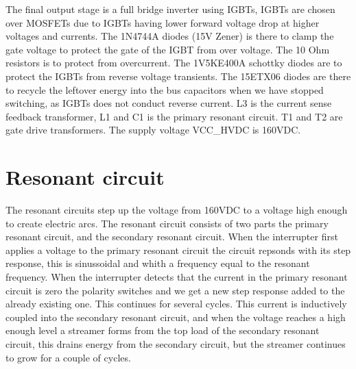 The final output stage is a full bridge inverter using IGBTs, IGBTs are chosen over MOSFETs due to IGBTs having lower forward voltage drop at higher voltages and currents. The 1N4744A diodes (15V Zener) is there to clamp the gate voltage to protect the gate of the IGBT from over voltage. The 10 Ohm resistors is to protect from overcurrent. The 1V5KE400A schottky diodes are to protect the IGBTs from reverse voltage transients. The 15ETX06 diodes are there to recycle the leftover energy into the bus capacitors when we have stopped switching, as IGBTs does not conduct reverse current. L3 is the current sense feedback transformer, L1 and C1 is the primary resonant circuit. T1 and T2 are gate drive transformers. The supply voltage VCC\_HVDC is 160VDC.


\section{Resonant circuit}

The resonant circuits step up the voltage from 160VDC to a voltage high enough to create electric arcs. The resonant circuit consists of two parts the primary resonant circuit, and the secondary resonant circuit. When the interrupter first applies a voltage to the primary resonant circuit the circuit repsonds with its step response, this is sinussoidal and whith a frequency equal to the resonant frequency. When the interrupter detects that the current in the primary resonant circuit is zero the polarity switches and we get a new step response added to the already existing one. This continues for several cycles. This current is inductively coupled into the secondary resonant circuit, and when the voltage reaches a high enough level a streamer forms from the top load of the secondary resonant circuit, this drains energy from the secondary circuit, but the streamer continues to grow for a couple of cycles.

